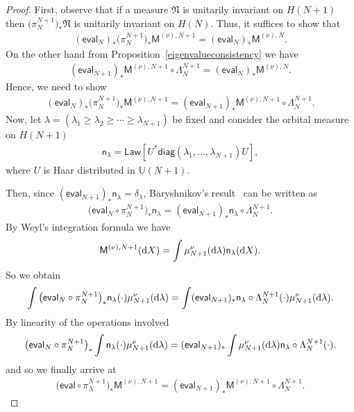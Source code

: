 \begin{proof}First, observe that if a measure $\mathfrak{N}$ is unitarily invariant on $H(N+1)$ then $\big(\pi_{N}^{N+1}\big)_*\mathfrak{N}$ is unitarily invariant on $H(N)$. Thus, it suffices to show that
\begin{gather*}
 (\mathsf{eval}_N )_*\big(\pi_N^{N+1}\big)_*\mathsf{M}^{(\nu),N+1}= (\mathsf{eval}_N )_*\mathsf{M}^{(\nu),N}.
\end{gather*}
On the other hand from Proposition~\ref{eigenvalueconsistency} we have
\begin{gather*}
\left(\mathsf{eval}_{N+1}\right)_*\mathsf{M}^{(\nu),N+1}\circ \Lambda_N^{N+1}=\left(\mathsf{eval}_N\right)_*\mathsf{M}^{(\nu),N}.
\end{gather*}
Hence, we need to show
\begin{gather*}
 (\mathsf{eval}_N )_*\big(\pi_N^{N+1}\big)_*\mathsf{M}^{(\nu),N+1}= (\mathsf{eval}_{N+1} )_*\mathsf{M}^{(\nu),N+1}\circ \Lambda_N^{N+1}.
\end{gather*}
Now, let $\lambda=(\lambda_1\ge \lambda_2 \ge \cdots \ge \lambda_{N+1})$ be fixed and consider the orbital measure on $H(N+1)${\samepage
\begin{gather*}
\mathsf{n}_{\lambda}=\mathsf{Law} [U^*\mathsf{diag}(\lambda_1,\dots, \lambda_{N+1})U ],
\end{gather*}
where $U$ is Haar distributed in $\mathbb{U}(N+1)$.}

Then, since $ (\mathsf{eval}_{N+1} )_*\mathsf{n}_{\lambda}=\delta_{\lambda}$, Baryshnikov's result~\cite{Baryshnikov} can be written as
\begin{gather*}
\big(\mathsf{eval}_N\circ\pi_N^{N+1}\big)_*\mathsf{n}_{\lambda}= (\mathsf{eval}_{N+1} )_*\mathsf{n}_{\lambda}\circ \Lambda_N^{N+1}.
\end{gather*}
By Weyl's integration formula we have
\begin{gather*}
\mathsf{M}^{(\nu),N+1}({\rm d}X)=\int\mu_{N+1}^{\nu}({\rm d}\lambda)\mathsf{n}_{\lambda}({\rm d}X).
\end{gather*}
So we obtain
\begin{gather*}
\int \big(\mathsf{eval}_N\circ\pi_N^{N+1}\big)_*\mathsf{n}_{\lambda}(\cdot) \mu_{N+1}^{\nu}({\rm d}\lambda)= \int (\mathsf{eval}_{N+1} )_*\mathsf{n}_{\lambda}\circ \Lambda_N^{N+1}(\cdot) \mu_{N+1}^{\nu}({\rm d}\lambda).
\end{gather*}
By linearity of the operations involved
\begin{gather*}
\big(\mathsf{eval}_N\circ\pi_N^{N+1}\big)_*\int \mathsf{n}_{\lambda}(\cdot) \mu_{N+1}^{\nu}({\rm d}\lambda)= (\mathsf{eval}_{N+1} )_*\int \mu_{N+1}^{\nu}({\rm d}\lambda)\mathsf{n}_{\lambda}\circ \Lambda_N^{N+1}(\cdot) .
\end{gather*}
and so we finally arrive at
\begin{gather*}
\big(\mathsf{eval}\circ\pi_N^{N+1}\big)_*\mathsf{M}^{(\nu),N+1}= (\mathsf{eval}_{N+1} )_*\mathsf{M}^{(\nu),N+1}\circ \Lambda_N^{N+1}.\tag*{\qed}
\end{gather*}\renewcommand{\qed}{}
\end{proof}

